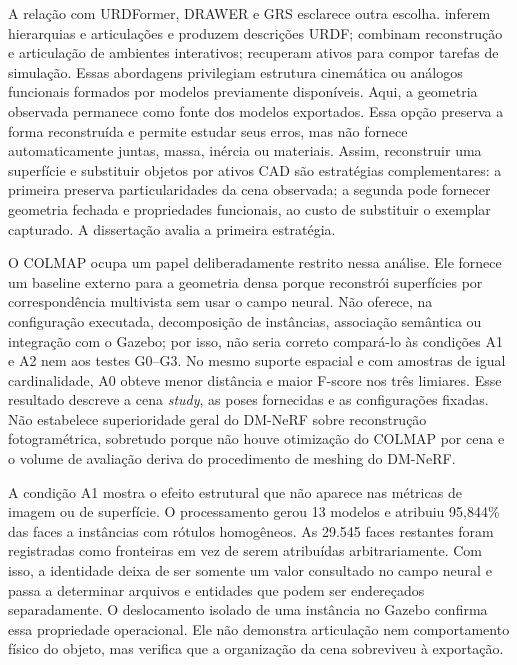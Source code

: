 A relação com URDFormer, DRAWER e GRS esclarece outra escolha. \citet{chen2024urdformer} inferem hierarquias e articulações e produzem descrições URDF; \citet{xia2025drawer} combinam reconstrução e articulação de ambientes interativos; \citet{zook2025grs} recuperam ativos para compor tarefas de simulação. Essas abordagens privilegiam estrutura cinemática ou análogos funcionais formados por modelos previamente disponíveis. Aqui, a geometria observada permanece como fonte dos modelos exportados. Essa opção preserva a forma reconstruída e permite estudar seus erros, mas não fornece automaticamente juntas, massa, inércia ou materiais. Assim, reconstruir uma superfície e substituir objetos por ativos CAD são estratégias complementares: a primeira preserva particularidades da cena observada; a segunda pode fornecer geometria fechada e propriedades funcionais, ao custo de substituir o exemplar capturado. A dissertação avalia a primeira estratégia.

O COLMAP ocupa um papel deliberadamente restrito nessa análise. Ele fornece um baseline externo para a geometria densa porque reconstrói superfícies por correspondência multivista sem usar o campo neural. Não oferece, na configuração executada, decomposição de instâncias, associação semântica ou integração com o Gazebo; por isso, não seria correto compará-lo às condições A1 e A2 nem aos testes G0--G3. No mesmo suporte espacial e com amostras de igual cardinalidade, A0 obteve menor distância e maior F-score nos três limiares. Esse resultado descreve a cena \textit{study}, as poses fornecidas e as configurações fixadas. Não estabelece superioridade geral do DM-NeRF sobre reconstrução fotogramétrica, sobretudo porque não houve otimização do COLMAP por cena e o volume de avaliação deriva do procedimento de meshing do DM-NeRF.

A condição A1 mostra o efeito estrutural que não aparece nas métricas de imagem ou de superfície. O processamento gerou 13 modelos e atribuiu 95,844\% das faces a instâncias com rótulos homogêneos. As 29.545 faces restantes foram registradas como fronteiras em vez de serem atribuídas arbitrariamente. Com isso, a identidade deixa de ser somente um valor consultado no campo neural e passa a determinar arquivos e entidades que podem ser endereçados separadamente. O deslocamento isolado de uma instância no Gazebo confirma essa propriedade operacional. Ele não demonstra articulação nem comportamento físico do objeto, mas verifica que a organização da cena sobreviveu à exportação.

